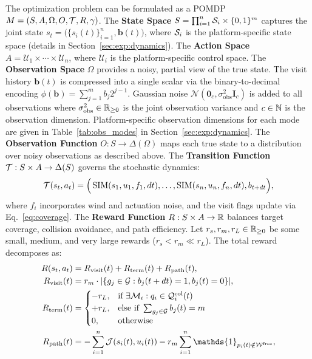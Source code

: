 \documentclass{article}
\providecommand{\free}{\mathrm{free}}
\providecommand{\col}{\mathrm{col}}
\begin{document}
The optimization problem can be formulated as a POMDP $M = (S, A, \Omega, O, \mathcal{T}, R, \gamma)$. The \textbf{State Space} $S = \prod_{i=1}^n \mathcal{S}_i \times \{0,1\}^m$ captures the joint state $s_t = \big(\{s_i(t)\}_{i=1}^n,  \mathbf{b}(t)\big)$, where $\mathcal{S}_i$ is the platform-specific state space (details in Section~\ref{sec:exp:dynamics}). The \textbf{Action Space} $A = \mathcal{U}_1 \times \cdots \times \mathcal{U}_n$, where $\mathcal{U}_i$ is the platform-specific control space. The \textbf{Observation Space} $\Omega$ provides a noisy, partial view of the true state. The visit history $\mathbf{b}(t)$ is compressed into a single scalar via the binary-to-decimal encoding $\phi(\mathbf{b}) = \sum_{j=1}^m b_j 2^{j-1}$. Gaussian noise $\mathcal{N}(\mathbf{0}_c, \sigma_\mathrm{obs}^2 \mathbf{I}_c)$ is added to all observations where $\sigma_\mathrm{obs}^2 \in \mathbb{R}_{\geq 0}$ is the joint observation variance and $c \in \mathbb{N}$ is the observation dimension. Platform-specific observation dimensions for each mode are given in Table~\ref{tab:obs_modes} in Section~\ref{sec:exp:dynamics}. The \textbf{Observation Function} $O : S \to \Delta(\Omega)$ maps each true state to a distribution over noisy observations as described above. The \textbf{Transition Function} $\mathcal{T} : S \times A \to \Delta(S)$ governs the stochastic dynamics:
\begin{equation}
    \mathcal{T}(s_t, a_t) = \Big(\operatorname{SIM}(s_1, u_1, f_1, dt), \ldots, \operatorname{SIM}(s_n, u_n, f_n, dt),  b_{t+dt}\Big), \label{eq:transition}
\end{equation}
where $f_i$ incorporates wind and actuation noise, and the visit flags update via Eq.~\eqref{eq:coverage}. The \textbf{Reward Function} $R : S \times A \to \mathbb{R}$ balances target coverage, collision avoidance, and path efficiency. Let $r_s, r_m, r_L \in \mathbb{R}_{\geq 0}$ be some small, medium, and very large rewards ($r_s < r_m \ll r_L$). The total reward decomposes as:
\begin{alignat}{2}
    R(s_t, a_t) &= \rvisit(t) + \rterm(t) + \rpath(t), \label{eq:reward}\\
    \rvisit(t)  &= r_m \cdot |\{g_j \in \goals : b_j(t + dt) = 1,  b_j(t) = 0\}|, \label{eq:r_visit} \\
    \rterm(t)   &=
    \begin{cases}
        -r_L, & \text{if } \exists \mathcal{M}_i: q_i \in \config_i^{\col}(t) \\
        +r_L, & \text{else if } \sum_{g_j \in \goals} b_j(t) = m \\
        0,    & \text{otherwise}
    \end{cases} \label{eq:r_term} \\
    \rpath(t)   &= - \sum_{i=1}^n \mathcal{J}(s_i(t), u_i(t))
                   - r_m \sum_{i=1}^n \mathds{1}_{p_i(t) \notin \wspace^{\free}}, \label{eq:r_path}
\end{alignat}
\end{document}
